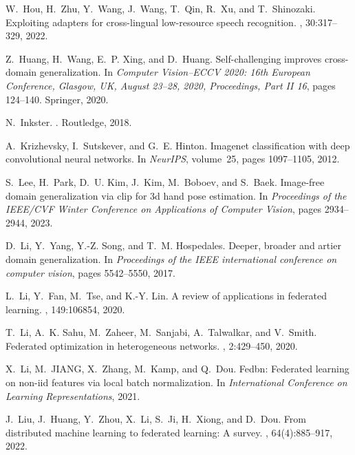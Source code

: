 \documentclass[11pt]{article}
\begin{document}
\begin{thebibliography}{10}
W.~Hou, H.~Zhu, Y.~Wang, J.~Wang, T.~Qin, R.~Xu, and T.~Shinozaki.
\newblock Exploiting adapters for cross-lingual low-resource speech
  recognition.
, 30:317--329,
  2022.

Z.~Huang, H.~Wang, E.~P. Xing, and D.~Huang.
\newblock Self-challenging improves cross-domain generalization.
\newblock In {\em Computer Vision--ECCV 2020: 16th European Conference,
  Glasgow, UK, August 23--28, 2020, Proceedings, Part II 16}, pages 124--140.
  Springer, 2020.

N.~Inkster.
.
\newblock Routledge, 2018.

A.~Krizhevsky, I.~Sutskever, and G.~E. Hinton.
\newblock Imagenet classification with deep convolutional neural networks.
\newblock In {\em NeurIPS}, volume~25, pages 1097--1105, 2012.

S.~Lee, H.~Park, D.~U. Kim, J.~Kim, M.~Boboev, and S.~Baek.
\newblock Image-free domain generalization via clip for 3d hand pose
  estimation.
\newblock In {\em Proceedings of the IEEE/CVF Winter Conference on Applications
  of Computer Vision}, pages 2934--2944, 2023.

D.~Li, Y.~Yang, Y.-Z. Song, and T.~M. Hospedales.
\newblock Deeper, broader and artier domain generalization.
\newblock In {\em Proceedings of the IEEE international conference on computer
  vision}, pages 5542--5550, 2017.

L.~Li, Y.~Fan, M.~Tse, and K.-Y. Lin.
\newblock A review of applications in federated learning.
, 149:106854, 2020.

T.~Li, A.~K. Sahu, M.~Zaheer, M.~Sanjabi, A.~Talwalkar, and V.~Smith.
\newblock Federated optimization in heterogeneous networks.
, 2:429--450, 2020.

X.~Li, M.~JIANG, X.~Zhang, M.~Kamp, and Q.~Dou.
\newblock Fedbn: Federated learning on non-iid features via local batch
  normalization.
\newblock In {\em International Conference on Learning Representations}, 2021.

J.~Liu, J.~Huang, Y.~Zhou, X.~Li, S.~Ji, H.~Xiong, and D.~Dou.
\newblock From distributed machine learning to federated learning: A survey.
, 64(4):885--917, 2022.


\end{thebibliography}
\end{document}
